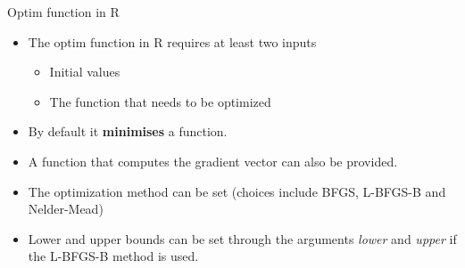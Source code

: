 \documentclass[10pt]{beamer}
\begin{document}
                                                                                              \begin{frame}{Optim function in R}
                                                                                                \begin{itemize}
                                                                                                \item The optim function in R requires at least two inputs
                                                                                                  \begin{itemize}
                                                                                                  \item Initial values
                                                                                                  \item The function that needs to be optimized
                                                                                                  \end{itemize}

                                                                                                \item By default it {\bf minimises} a function.

                                                                                                \item A function that computes the gradient vector can also be provided.

                                                                                                \item The optimization method can be set (choices include BFGS, L-BFGS-B and Nelder-Mead)

                                                                                                \item Lower and upper bounds can be set through the arguments {\em lower} and {\em upper} if the L-BFGS-B method is used.
                                                                                                \end{itemize}
                                                                                              \end{frame}
\end{document}
